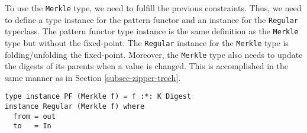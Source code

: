 To use the \texttt{Merkle} type, we need to fulfill the previous constraints. Thus, we need to define a type instance for the pattern functor and an instance for the \texttt{Regular} typeclass. The pattern functor type instance is the same definition as the \texttt{Merkle} type but without the fixed-point. The \texttt{Regular} instance for the \texttt{Merkle} type is folding/unfolding the fixed-point. Moreover, the \texttt{Merkle} type also needs to update the digests of its parents when a value is changed. This is accomplished in the same manner as in Section \ref*{subsec-zipper-treeh}.

\begin{verbatim}
type instance PF (Merkle f) = f :*: K Digest
instance Regular (Merkle f) where
  from = out
  to   = In
\end{verbatim}




